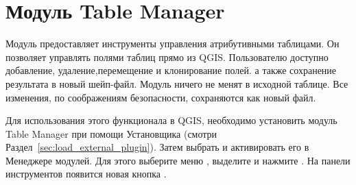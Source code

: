 
\section{Модуль Table Manager}\label{sec:ftools}


Модуль предоставляет инструменты управления атрибутивными таблицами. Он
позволяет управлять полями таблиц прямо из QGIS. Пользователю доступно
добавление, удаление,перемещение и клонирование полей. а также сохранение
результата в новый шейп-файл. Модуль ничего не менят в исходной таблице.
Все изменения, по соображениям безопасности, сохраняются как новый файл.


Для использования этого функционала в QGIS, необходимо установить модуль
Table Manager при помощи  Установщика
(смотри Раздел~\ref{sec:load_external_plugin}). Затем выбрать и
активировать его в Менеджере модулей. Для этого выберите меню
 \arrow {}, выделите
 и нажмите . На панели
инструментов появится новая кнопка .
